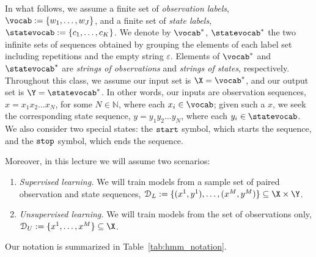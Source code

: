 In what follows, 
we assume a finite set of \emph{observation labels}, 
$\vocab := \{w_1,\ldots,w_J\}$,
and a finite set of \emph{state labels}, 
$\statevocab := \{c_1,\ldots, c_K\}$. We denote by $\vocab^*$, $\statevocab^*$ the two infinite sets of sequences obtained by grouping the elements of each label set including repetitions and the empty string $\varepsilon$\footnotemark{}. 
Elements of $\vocab^*$ and $\statevocab^*$ 
are \emph{strings of observations} and \emph{strings of states}, 
respectively. 
Throughout this class, we 
assume our input set is $\X = \vocab^*$, 
and our output set is $\Y = \statevocab^*$. 
In other words, 
our inputs are observation sequences, 
$x = x_1 x_2 \ldots x_N$, 
for some $N \in \mathbb{N}$, where each $x_i \in \vocab$;
given such a $x$, we seek 
the corresponding state sequence, 
$y = y_1 y_2 \ldots y_N$, 
where each $y_i \in \statevocab$. We also consider two special states: the ${\tt start}$ symbol,
which starts the sequence, and 
the ${\tt stop}$ symbol, which ends the sequence. 

Moreover, in this lecture we will assume two scenarios:
\begin{enumerate}
\item \emph{Supervised learning.} We will 
train models from a sample set of paired observation and state sequences, $\mathcal{D}_L := \{(x^1,y^1), \ldots, (x^M,y^M)\} \subseteq \X \times \Y$.
\item \emph{Unsupervised learning.} We will
train models from the set of observations only, $\mathcal{D}_U := \{x^1, \ldots, x^M\} \subseteq \X$.
\end{enumerate}
Our notation is summarized in Table~\ref{tab:hmm_notation}.

%

